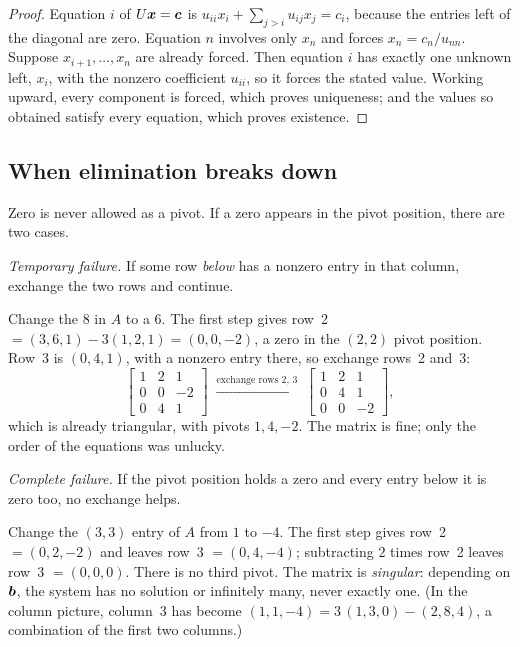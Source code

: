 \begin{proof}
Equation $i$ of $U\boldsymbol{x}=\boldsymbol{c}$ is $u_{ii}x_i+\sum_{j>i}u_{ij}x_j=c_i$, because the entries
left of the diagonal are zero. Equation $n$ involves only $x_n$ and forces $x_n=c_n/u_{nn}$.
Suppose $x_{i+1},\dots,x_n$ are already forced. Then equation $i$ has exactly one unknown
left, $x_i$, with the nonzero coefficient $u_{ii}$, so it forces the stated value. Working
upward, every component is forced, which proves uniqueness; and the values so obtained
satisfy every equation, which proves existence.
\end{proof}

\subsection{When elimination breaks down}

Zero is never allowed as a pivot. If a zero appears in the pivot position, there are two
cases.

\emph{Temporary failure.} If some row \emph{below} has a nonzero entry in that column,
exchange the two rows and continue.

\begin{example}\label{ex:u03-exchange}
Change the $8$ in $A$ to a $6$. The first step gives
row~2 $=(3,6,1)-3(1,2,1)=(0,0,-2)$, a zero in the $(2,2)$ pivot position. Row~3 is
$(0,4,1)$, with a nonzero entry there, so exchange rows~2 and~3:
\[
  \begin{bmatrix} 1 & 2 & 1\\ 0 & 0 & -2\\ 0 & 4 & 1\end{bmatrix}
  \;\xrightarrow{\text{exchange rows 2, 3}}\;
  \begin{bmatrix} 1 & 2 & 1\\ 0 & 4 & 1\\ 0 & 0 & -2\end{bmatrix},
\]
which is already triangular, with pivots $1,4,-2$. The matrix is fine; only the order of the
equations was unlucky.
\end{example}

\emph{Complete failure.} If the pivot position holds a zero and every entry below it is zero
too, no exchange helps.

\begin{example}\label{ex:u03-singular}
Change the $(3,3)$ entry of $A$ from $1$ to $-4$. The first step
gives row~2 $=(0,2,-2)$ and leaves row~3 $=(0,4,-4)$; subtracting $2$ times row~2 leaves
row~3 $=(0,0,0)$. There is no third pivot. The matrix is \emph{singular}: depending on
$\boldsymbol{b}$, the system has no solution or infinitely many, never exactly one. (In the column
picture, column~3 has become $(1,1,-4)=3\,(1,3,0)-(2,8,4)$, a combination of the
first two columns.)
\end{example}

